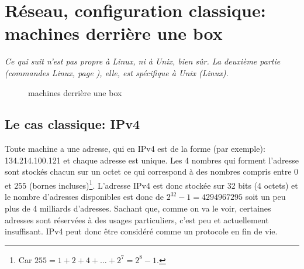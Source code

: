 \section{Réseau, configuration classique: machines derrière une \og
  box\fg}

\begin{center}
  \begin{minipage}{0.6\textwidth}
    \textsl{Ce qui suit n'est pas propre à Linux, ni à Unix, bien sûr.
      La deuxième partie (commandes Linux, page \pageref{netlinux}),
      elle, est spécifique à Unix 
      (Linux).} 
  \end{minipage}
\end{center}
\begin{figure}
  \caption{machines derrière une  \og   box\fg}\label{box}
\end{figure}

\subsection{Le cas \og classique\fg{}: IPv4}
Toute machine a une adresse, qui en IPv4 est de la forme (par
exemple): 134.214.100.121 et chaque adresse est unique. Les 4 nombres
qui forment l'adresse sont stockés chacun sur un octet ce qui
correspond à des nombres compris entre $0$ et $255$
(bornes incluses)\footnote{Car $255 = 1+2 +4+\ldots+2^7 = 2^8 -1$.}. L'adresse
IPv4 est donc stockée sur 32 bits (4 octets) et le nombre d'adresses
disponibles est donc de $2^{32} -1= 4294967295$ soit un peu plus de 4
milliards d'adresses. Sachant que, comme on va le voir, certaines
adresses sont réservées à des usages particuliers, c'est peu et
actuellement insuffisant. IPv4 peut donc être considéré comme un
protocole en fin de vie.

